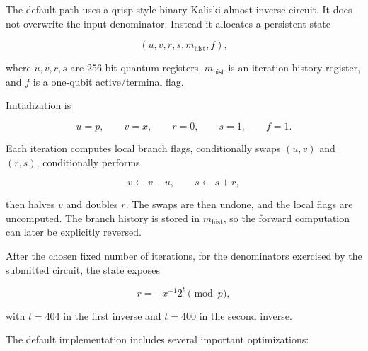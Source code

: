 \documentclass[11pt]{article}
\begin{document}
The default path uses a qrisp-style binary Kaliski almost-inverse circuit.  It
does not overwrite the input denominator.  Instead it allocates a persistent
state

\[
(u,v,r,s,m_{\mathrm{hist}},f),
\]

where \(u,v,r,s\) are 256-bit quantum registers, \(m_{\mathrm{hist}}\) is an
iteration-history register, and \(f\) is a one-qubit active/terminal flag.

Initialization is

\[
u=p,
\qquad
v=x,
\qquad
r=0,
\qquad
s=1,
\qquad
f=1.
\]

Each iteration computes local branch flags, conditionally swaps \((u,v)\) and
\((r,s)\), conditionally performs

\[
v \leftarrow v-u,
\qquad
s \leftarrow s+r,
\]

then halves \(v\) and doubles \(r\).  The swaps are then undone, and the local
flags are uncomputed.  The branch history is stored in \(m_{\mathrm{hist}}\), so
the forward computation can later be explicitly reversed.

After the chosen fixed number of iterations, for the denominators exercised by
the submitted circuit, the state exposes

\[
r = -x^{-1}2^t \pmod p,
\]

with \(t=404\) in the first inverse and \(t=400\) in the second inverse.

The default implementation includes several important optimizations:
\end{document}
